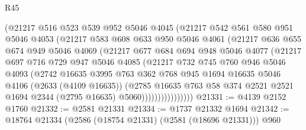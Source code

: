 \begin{lexlean}{R45}
\begin{coremodule}
                  (@21217
                    @516
                    @523
                    @539
                    @952
                    @5046
                    @4045
                    (@21217
                      @542
                      @561
                      @580
                      @951
                      @5046
                      @4053
                      (@21217
                        @583
                        @608
                        @633
                        @950
                        @5046
                        @4061
                        (@21217
                          @636
                          @655
                          @674
                          @949
                          @5046
                          @4069
                          (@21217
                            @677
                            @684
                            @694
                            @948
                            @5046
                            @4077
                            (@21217
                              @697
                              @716
                              @729
                              @947
                              @5046
                              @4085
                              (@21217
                                @732
                                @745
                                @760
                                @946
                                @5046
                                @4093
                                (@2742
                                  @16635
                                  @3995
                                  @763
                                  @362
                                  @768
                                  @945
                                  @1694
                                  @16635
                                  @5046
                                  @4106
                                  (@2633 (@4109 @16635))
                                  (@2785
                                    @16635
                                    @763
                                    @58
                                    @374
                                    @2521
                                    @2521
                                    @1694
                                    @2344
                                    (@2795 @16635)
                                    @5060))))))))))))))))
@21331 := @4139 @2152 @1760
@21332 := @2581 @21331
@21334 := @1737 @21332 @1694
@21342 := @18764 @21334 (@2586 (@18754 @21331) (@2581 (@18696 @21331))) @960

\end{coremodule}
\end{lexlean}
